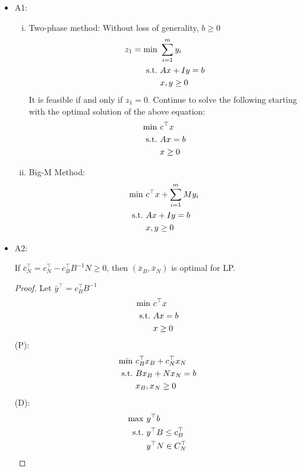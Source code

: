 \documentclass[11pt]{article}
\numberwithin{equation}{section}
\begin{document}
\begin{itemize}
    \item A1: \begin{enumerate}[(i)]
        \item Two-phase method: Without loss of generality, $b \geq 0$ \begin{align*}
            z_1 = \min \  & \sum_{i=1}^m y_i \\
                \text{s.t.} \  & Ax + Iy =b \\ & x,y \geq 0 
        \end{align*}
        It is feasible if and only if $z_1=0$. Continue to solve the following starting with the optimal solution of the above equation:
        \begin{align*}
            \min \  & {c}^{\top} {x} \\
                \text{s.t.} \  & Ax=b \\ & x \geq 0 
        \end{align*}
        \item Big-M Method:\begin{align*}
            \min \  & {c}^{\top} {x} + \sum_{i=1}^m M y_i \\
                \text{s.t.} \  & Ax + Iy =b \\ & x,y \geq 0 
        \end{align*}
    \end{enumerate}
    \item A2: \begin{proposition}
        If $\bar{c}_N^\top = c_N^\top - c_B^\top B^{-1} N \geq 0 $, then $(\bar{x}_B, \bar{x}_N)$ is optimal for LP.
        \begin{proof}
            Let $\bar{y}^\top=c^\top_B B^{-1}$ \begin{align*}
                \min \  & {c}^{\top} {x} \\
                \text{s.t.} \  & Ax=b \\ & x \geq 0 
            \end{align*}
            (P):
            \begin{align*}
                \min \  & c_B^\top {x}_B + c_N^\top x_N \\
                \text{s.t.} \  & Bx_B + N x_N =b \\ & x_B, x_N \geq 0 
            \end{align*}
            (D):
            \begin{align*}
                \max \  & y^\top b \\
                \st \  & y^\top B \leq c_B^\top \\ & y^{\top} N \in C_N^{\top}

\end{align*}
\end{proof}
\end{proposition}
\end{itemize}
\end{document}
